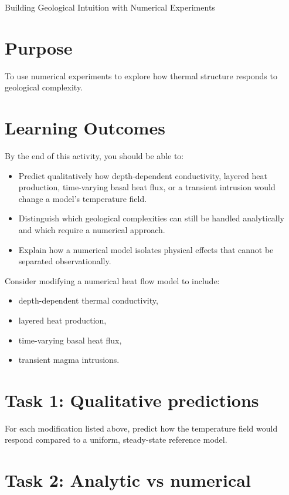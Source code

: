 \begin{activity}{Building Geological Intuition with Numerical Experiments}

\section*{Purpose}
To use numerical experiments to explore how thermal structure responds to geological complexity.

\section*{Learning Outcomes}

By the end of this activity, you should be able to:
\begin{itemize}
    \item Predict qualitatively how depth-dependent conductivity, layered heat production, time-varying basal heat flux, or a transient intrusion would change a model's temperature field.
    \item Distinguish which geological complexities can still be handled analytically and which require a numerical approach.
    \item Explain how a numerical model isolates physical effects that cannot be separated observationally.
\end{itemize}

Consider modifying a numerical heat flow model to include:
\begin{itemize}
    \item depth-dependent thermal conductivity,
    \item layered heat production,
    \item time-varying basal heat flux,
    \item transient magma intrusions.
\end{itemize}

\section*{Task 1: Qualitative predictions}

For each modification listed above, predict how the temperature field would respond compared to a uniform, steady-state reference model.
\answerbox[8cm]

\section*{Task 2: Analytic vs numerical}


\end{activity}
